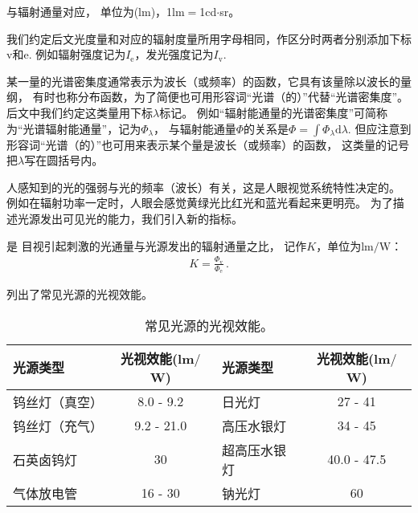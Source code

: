 与辐射通量对应，
单位为(lm)，1lm$=$1cd$\cdot$sr。

\begin{notation}
      我们约定后文光度量和对应的辐射度量所用字母相同，作区分时两者分别添加下标$\mathrm{v}$和$\mathrm{e}$.
      例如辐射强度记为$I_{\mathrm{e}}$，发光强度记为$I_{\mathrm{v}}$.
\end{notation}

\begin{notation}
      某一量的光谱密集度通常表示为波长（或频率）的函数，它具有该量除以波长的量纲，
      有时也称分布函数，为了简便也可用形容词“光谱（的）”代替“光谱密集度”。
      后文中我们约定这类量用下标$\lambda$标记。
      例如“辐射能通量的光谱密集度”可简称为“光谱辐射能通量”，记为$\varPhi_{\lambda}$，
      与辐射能通量$\varPhi$的关系是$\displaystyle\varPhi=\int \varPhi_{\lambda}\mathrm{d}\lambda$.
      但应注意到形容词“光谱（的）”也可用来表示某个量是波长（或频率）的函数，
      这类量的记号把$\lambda$写在圆括号内。
\end{notation}

人感知到的光的强弱与光的频率（波长）有关，这是人眼视觉系统特性决定的。
例如在辐射功率一定时，人眼会感觉黄绿光比红光和蓝光看起来更明亮。
为了描述光源发出可见光的能力，我们引入新的指标。

\begin{definition}
      是
      目视引起刺激的光通量与光源发出的辐射通量之比，
      记作$K$，单位为lm$/$W：
      \begin{align}
            K=\frac{\varPhi_{\mathrm{v}}}{\varPhi_{\mathrm{e}}}\, .
      \end{align}
\end{definition}

列出了常见光源的光视效能。
\begin{table}[htbp]
      \centering
      \begin{tabular}{lc|lc}
            \toprule
            \textbf{光源类型} & \textbf{光视效能(lm$/$W)} & \textbf{光源类型} & \textbf{光视效能(lm$/$W)} \\
            \midrule
            钨丝灯（真空）    & 8.0 - 9.2                 & 日光灯            & 27 - 41                   \\
            钨丝灯（充气）    & 9.2 - 21.0                & 高压水银灯        & 34 - 45                   \\
            石英卤钨灯        & 30                        & 超高压水银灯      & 40.0 - 47.5               \\
            气体放电管        & 16 - 30                   & 钠光灯            & 60                        \\
            \bottomrule
      \end{tabular}
      \caption{常见光源的光视效能。}
      \label{tab:5.ex01}
\end{table}

